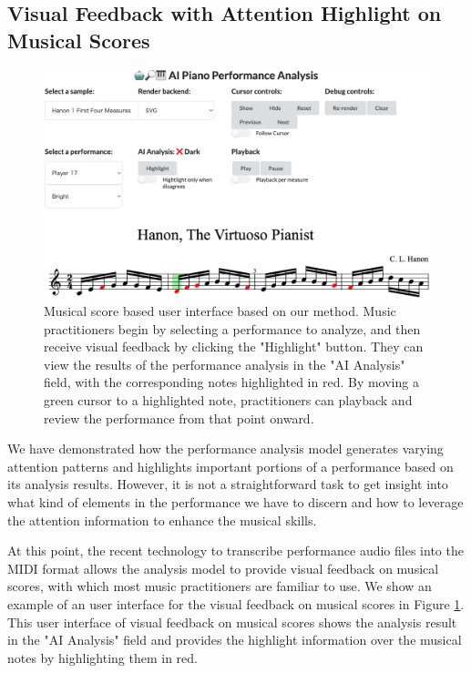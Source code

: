 \documentclass[sigconf,review,anonymous]{acmart}
\begin{document}
\subsection{Visual Feedback with Attention Highlight on Musical Scores} \label{visualization_score}
\begin{figure}[h!]
  \centering
  \includegraphics[width=\linewidth]{figures/UI_v110.png}
  \caption{Musical score based user interface based on our method. Music practitioners begin by selecting a performance to analyze, and then receive visual feedback by clicking the "Highlight" button. They can view the results of the performance analysis in the "AI Analysis" field, with the corresponding notes highlighted in red. By moving a green cursor to a highlighted note, practitioners can playback and review the performance from that point onward.}
  \label{UI}
\end{figure}

We have demonstrated how the performance analysis model generates varying attention patterns and highlights important portions of a performance based on its analysis results. 
However, it is not a straightforward task to get insight into what kind of elements in the performance we have to discern and how to leverage the attention information to enhance the musical skills.

At this point, the recent technology to transcribe performance audio files into the MIDI format \cite{hawthorne2021, gardner2022} allows the analysis model to provide visual feedback on musical scores, with which most music practitioners are familiar to use.
We show an example of an user interface for the visual feedback on musical scores in Figure \ref{UI}.
This user interface of visual feedback on musical scores shows the analysis result in the "AI Analysis" field and provides the highlight information over the musical notes by highlighting them in red.
\end{document}
